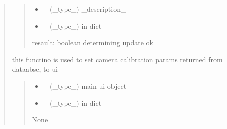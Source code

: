 \documentclass[letterpaper,10pt,english]{sphinxmanual}
\begin{document}
\begin{quote}
\begin{savenotes}
\begin{fulllineitems}
\begin{quote}
\begin{description}
\begin{itemize}
\item {} 
\sphinxAtStartPar
{} – (\_type\_) \_description\_

\item {} 
\sphinxAtStartPar
{} – (\_type\_) in dict

\end{itemize}

\sphinxAtStartPar
resault: boolean determining update ok

\end{description}\end{quote}

\end{fulllineitems}\end{savenotes}


\begin{savenotes}\begin{fulllineitems}
\label{\detokenize{setting/backend/camera_funcs:oxin.backend.camera_funcs.set_camera_calibration_params_to_ui}}
\pysigstartsignatures
{}
\pysigstopsignatures
\sphinxAtStartPar
this functino is used to set camera calibration params returned from dataabse, to ui
\begin{quote}\begin{description}
\begin{itemize}
\item {} 
\sphinxAtStartPar
{} – (\_type\_) main ui object

\item {} 
\sphinxAtStartPar
{} – (\_type\_) in dict

\end{itemize}

\sphinxAtStartPar
None

\end{description}\end{quote}


\end{fulllineitems}
\end{savenotes}
\end{quote}
\end{document}
